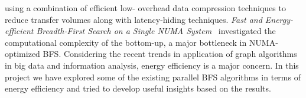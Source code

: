using a combination of efficient low- overhead data compression
techniques to reduce transfer volumes along with latency-hiding
techniques.
\newline
\emph{Fast and Energy-efficient Breadth-First Search on a Single NUMA
System}~\cite{ENERGY-BFS} investigated the computational complexity of
the bottom-up, a major bottleneck in NUMA-optimized BFS.
\newline
Considering the recent trends in application of graph algorithms in
big data and information analysis, energy efficiency is a major
concern. In this project we have explored some of the existing
parallel BFS algorithms in terms of energy efficiency and tried to
develop useful insights based on the results.
